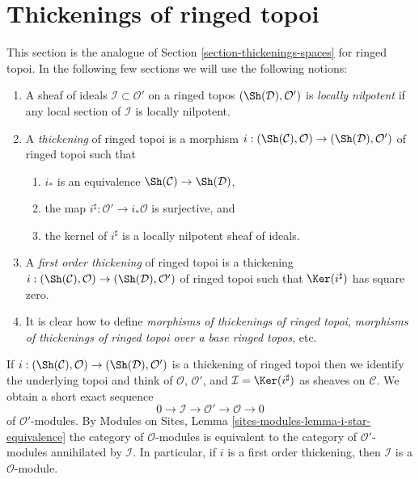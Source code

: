 \section{Thickenings of ringed topoi}
\label{section-thickenings-ringed-topoi}

\noindent
This section is the analogue of Section \ref{section-thickenings-spaces}
for ringed topoi.
In the following few sections we will use the following notions:
\begin{enumerate}
\item A sheaf of ideals $\mathcal{I} \subset \mathcal{O}'$ on
a ringed topos $(\Sh(\mathcal{D}), \mathcal{O}')$ is {\it locally nilpotent}
if any local section of $\mathcal{I}$ is locally nilpotent.
\item A {\it thickening} of ringed topoi is a morphism
$i : (\Sh(\mathcal{C}), \mathcal{O}) \to (\Sh(\mathcal{D}), \mathcal{O}')$
of ringed topoi such that
\begin{enumerate}
\item $i_*$ is an equivalence $\Sh(\mathcal{C}) \to \Sh(\mathcal{D})$,
\item the map $i^\sharp : \mathcal{O}' \to i_*\mathcal{O}$
is surjective, and
\item the kernel of $i^\sharp$ is a locally nilpotent sheaf of ideals.
\end{enumerate}
\item A {\it first order thickening} of ringed topoi is a thickening
$i : (\Sh(\mathcal{C}), \mathcal{O}) \to (\Sh(\mathcal{D}), \mathcal{O}')$
of ringed topoi such that $\Ker(i^\sharp)$ has square zero.
\item It is clear how to define
{\it morphisms of thickenings of ringed topoi},
{\it morphisms of thickenings of ringed topoi over a base ringed topos}, etc.
\end{enumerate}
If
$i : (\Sh(\mathcal{C}), \mathcal{O}) \to (\Sh(\mathcal{D}), \mathcal{O}')$
is a thickening of ringed topoi then we identify the underlying topoi
and think of $\mathcal{O}$, $\mathcal{O}'$, and
$\mathcal{I} = \Ker(i^\sharp)$ as sheaves on $\mathcal{C}$.
We obtain a short exact sequence
$$
0 \to \mathcal{I} \to \mathcal{O}' \to \mathcal{O} \to 0
$$
of $\mathcal{O}'$-modules. By
Modules on Sites, Lemma \ref{sites-modules-lemma-i-star-equivalence}
the category of $\mathcal{O}$-modules is equivalent to the category
of $\mathcal{O}'$-modules annihilated by $\mathcal{I}$. In particular,
if $i$ is a first order thickening, then
$\mathcal{I}$ is a $\mathcal{O}$-module.

